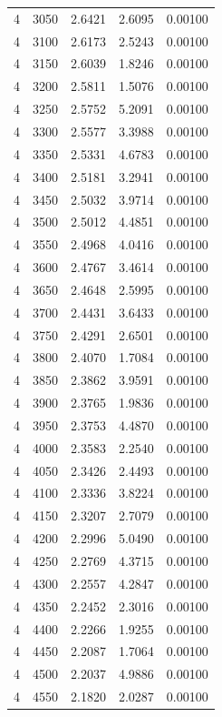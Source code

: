 \begin{longtable}{ccccc}
    4 & 3050 & 2.6421 & 2.6095 & 0.00100 \\
    4 & 3100 & 2.6173 & 2.5243 & 0.00100 \\
    4 & 3150 & 2.6039 & 1.8246 & 0.00100 \\
    4 & 3200 & 2.5811 & 1.5076 & 0.00100 \\
    4 & 3250 & 2.5752 & 5.2091 & 0.00100 \\
    4 & 3300 & 2.5577 & 3.3988 & 0.00100 \\
    4 & 3350 & 2.5331 & 4.6783 & 0.00100 \\
    4 & 3400 & 2.5181 & 3.2941 & 0.00100 \\
    4 & 3450 & 2.5032 & 3.9714 & 0.00100 \\
    4 & 3500 & 2.5012 & 4.4851 & 0.00100 \\
    4 & 3550 & 2.4968 & 4.0416 & 0.00100 \\
    4 & 3600 & 2.4767 & 3.4614 & 0.00100 \\
    4 & 3650 & 2.4648 & 2.5995 & 0.00100 \\
    4 & 3700 & 2.4431 & 3.6433 & 0.00100 \\
    4 & 3750 & 2.4291 & 2.6501 & 0.00100 \\
    4 & 3800 & 2.4070 & 1.7084 & 0.00100 \\
    4 & 3850 & 2.3862 & 3.9591 & 0.00100 \\
    4 & 3900 & 2.3765 & 1.9836 & 0.00100 \\
    4 & 3950 & 2.3753 & 4.4870 & 0.00100 \\
    4 & 4000 & 2.3583 & 2.2540 & 0.00100 \\
    4 & 4050 & 2.3426 & 2.4493 & 0.00100 \\
    4 & 4100 & 2.3336 & 3.8224 & 0.00100 \\
    4 & 4150 & 2.3207 & 2.7079 & 0.00100 \\
    4 & 4200 & 2.2996 & 5.0490 & 0.00100 \\
    4 & 4250 & 2.2769 & 4.3715 & 0.00100 \\
    4 & 4300 & 2.2557 & 4.2847 & 0.00100 \\
    4 & 4350 & 2.2452 & 2.3016 & 0.00100 \\
    4 & 4400 & 2.2266 & 1.9255 & 0.00100 \\
    4 & 4450 & 2.2087 & 1.7064 & 0.00100 \\
    4 & 4500 & 2.2037 & 4.9886 & 0.00100 \\
    4 & 4550 & 2.1820 & 2.0287 & 0.00100 \\

\end{longtable}

